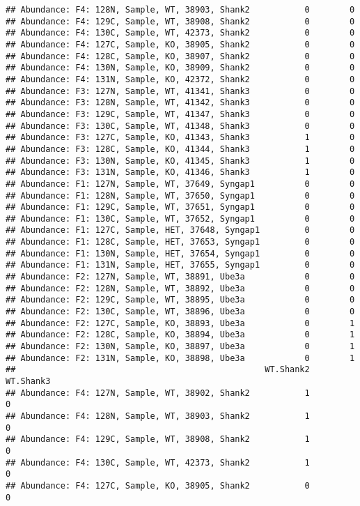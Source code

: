 \documentclass[]{article}
\begin{document}
\begin{verbatim}
## Abundance: F4: 128N, Sample, WT, 38903, Shank2           0        0
## Abundance: F4: 129C, Sample, WT, 38908, Shank2           0        0
## Abundance: F4: 130C, Sample, WT, 42373, Shank2           0        0
## Abundance: F4: 127C, Sample, KO, 38905, Shank2           0        0
## Abundance: F4: 128C, Sample, KO, 38907, Shank2           0        0
## Abundance: F4: 130N, Sample, KO, 38909, Shank2           0        0
## Abundance: F4: 131N, Sample, KO, 42372, Shank2           0        0
## Abundance: F3: 127N, Sample, WT, 41341, Shank3           0        0
## Abundance: F3: 128N, Sample, WT, 41342, Shank3           0        0
## Abundance: F3: 129C, Sample, WT, 41347, Shank3           0        0
## Abundance: F3: 130C, Sample, WT, 41348, Shank3           0        0
## Abundance: F3: 127C, Sample, KO, 41343, Shank3           1        0
## Abundance: F3: 128C, Sample, KO, 41344, Shank3           1        0
## Abundance: F3: 130N, Sample, KO, 41345, Shank3           1        0
## Abundance: F3: 131N, Sample, KO, 41346, Shank3           1        0
## Abundance: F1: 127N, Sample, WT, 37649, Syngap1          0        0
## Abundance: F1: 128N, Sample, WT, 37650, Syngap1          0        0
## Abundance: F1: 129C, Sample, WT, 37651, Syngap1          0        0
## Abundance: F1: 130C, Sample, WT, 37652, Syngap1          0        0
## Abundance: F1: 127C, Sample, HET, 37648, Syngap1         0        0
## Abundance: F1: 128C, Sample, HET, 37653, Syngap1         0        0
## Abundance: F1: 130N, Sample, HET, 37654, Syngap1         0        0
## Abundance: F1: 131N, Sample, HET, 37655, Syngap1         0        0
## Abundance: F2: 127N, Sample, WT, 38891, Ube3a            0        0
## Abundance: F2: 128N, Sample, WT, 38892, Ube3a            0        0
## Abundance: F2: 129C, Sample, WT, 38895, Ube3a            0        0
## Abundance: F2: 130C, Sample, WT, 38896, Ube3a            0        0
## Abundance: F2: 127C, Sample, KO, 38893, Ube3a            0        1
## Abundance: F2: 128C, Sample, KO, 38894, Ube3a            0        1
## Abundance: F2: 130N, Sample, KO, 38897, Ube3a            0        1
## Abundance: F2: 131N, Sample, KO, 38898, Ube3a            0        1
##                                                  WT.Shank2 WT.Shank3
## Abundance: F4: 127N, Sample, WT, 38902, Shank2           1         0
## Abundance: F4: 128N, Sample, WT, 38903, Shank2           1         0
## Abundance: F4: 129C, Sample, WT, 38908, Shank2           1         0
## Abundance: F4: 130C, Sample, WT, 42373, Shank2           1         0
## Abundance: F4: 127C, Sample, KO, 38905, Shank2           0         0

\end{verbatim}
\end{document}
